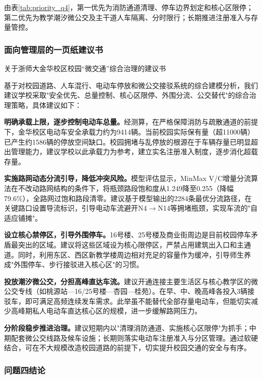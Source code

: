 \documentclass[UTF8,zihao=-4,a4paper]{ctexart}
\numberwithin{table}{section}
\numberwithin{figure}{section}
\numberwithin{equation}{section}
\begin{document}
由表\ref{tab:priority_q4}，第一优先为消防通道清理、停车边界划定和核心区限停；第二优先为教学潮汐微公交及主干道人车隔离、分时限行；长期推进注册准入与存量管控。

\subsubsection{面向管理层的一页纸建议书}

\begin{center}
{\heiti 关于浙师大金华校区校园“微交通”综合治理的建议书}
\end{center}

基于对校园道路、人车混行、电动车停放和微公交接驳系统的综合建模分析，我们建议学校采取"安全优先、总量控制、核心区限停、外围分流、公交替代"的综合治理策略，具体建议如下：

\textbf{明确承载上限，逐步控制电动车总量。}经测算，在严格保障消防与疏散通道的前提下，金华校区电动车安全承载力约为9414辆。当前校园实际保有量（超11000辆）已产生约1586辆的停放空间缺口。校园拥堵与乱停放的根源在于车辆存量已明显超出管理能力，建议学校以此承载力为参考，建立实名注册准入制度，逐步消化超载存量。

\textbf{实施路网动态分流引导，降低冲突风险。}模型评估显示，MinMax V/C增量分流算法在不改动路网结构的条件下，将瓶颈路段饱和度从1.249降至0.255（降幅79.6\%），全路网过饱和路段清零。建议基于模型输出的2284条最优分流路径，在关键路口设置导流标识，引导电动车流避开N4$\to$N14等拥堵瓶颈，实现车流的"自适应铺摊"。

\textbf{设立核心禁停区，引导外围停车。}16号楼、25号楼及商业街周边是目前校园停车矛盾最突出的区域。建议将这些区域设为核心限停区，严禁占用建筑出入口和主通道。同时，利用东区、西区新教学楼周边相对充足的容量作为缓冲，引导师生养成"外围停车、步行接驳进入核心区"的习惯。

\textbf{投放潮汐微公交，分担高峰直达车流。}建议开通连接主要生活区与核心教学区的微公交专线（如桃源站—16/25号楼—杏园—桂苑）。在早、中、晚高峰各投入3辆接驳车，即可满足高频连续发车需求。此举虽不能替代全部存量电动车，但能切实减少高峰期私人电动车直达核心区的规模，进一步缓解路网压力。

\textbf{分阶段稳步推进治理。}建议短期内以"清理消防通道、实施核心区限停"为抓手；中期配套微公交线路及候车设施；长期则落实电动车注册准入与分区管理。通过软硬结合，可在不大规模改造校园道路的前提下，切实提升校园交通的安全与有序。

\subsubsection{问题四结论}
\end{document}
